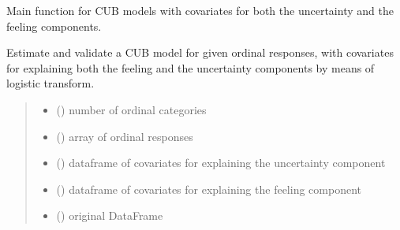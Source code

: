 \documentclass[letterpaper,10pt,english]{sphinxmanual}
\begin{document}
\begin{fulllineitems}
\label{\detokenize{cubmods:cubmods.cub_yw.mle}}
\pysigstartsignatures
{}
\pysigstopsignatures
\sphinxAtStartPar
Main function for CUB models with covariates for both the uncertainty and the feeling components.

\sphinxAtStartPar
Estimate and validate a CUB model for given ordinal responses, with covariates for explaining both the
feeling and the uncertainty components by means of logistic transform.
\begin{quote}\begin{description}
\begin{itemize}
\item {} 
\sphinxAtStartPar
{} () \textendash{} number of ordinal categories

\item {} 
\sphinxAtStartPar
{} () \textendash{} array of ordinal responses

\item {} 
\sphinxAtStartPar
{} () \textendash{} dataframe of covariates for explaining the uncertainty component

\item {} 
\sphinxAtStartPar
{} () \textendash{} dataframe of covariates for explaining the feeling component

\item {} 
\sphinxAtStartPar
{} () \textendash{} original DataFrame


\end{itemize}
\end{description}
\end{quote}
\end{fulllineitems}
\end{document}
